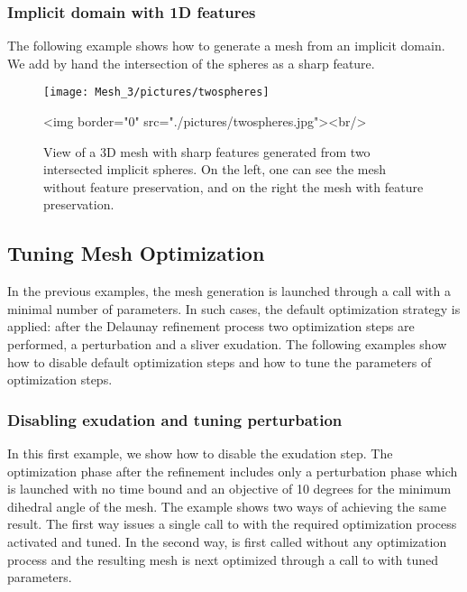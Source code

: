 \subsubsection{Implicit domain with 1D features}
The following example shows how to generate a mesh from an implicit
domain. We add by hand the intersection of the spheres as a sharp feature. 


\begin{figure}[ht]
\begin{center}
 \begin{ccTexOnly}
   \texttt{[image: Mesh\_3/pictures/twospheres]}
 \end{ccTexOnly}
 \begin{ccHtmlOnly}
   <img border="0" src="./pictures/twospheres.jpg"><br/>
 \end{ccHtmlOnly}
 \caption{View of a 3D mesh with sharp features generated from two intersected
 implicit spheres. On the left, one can see the mesh without feature preservation,
 and on the right the mesh with feature preservation.}
  \label{figure:two_spheres_mesh}
\end{center}
\end{figure}


\subsection{Tuning Mesh Optimization}
\label{Mesh_3_subsection_examples_optimization}

In the previous examples, the mesh generation is launched through a  call
 with a minimal number of parameters. In such cases, 
the default optimization strategy is applied: after the Delaunay refinement process
 two optimization steps are performed, a perturbation and  a sliver exudation.
The following examples show how to disable default optimization steps 
and how to tune the parameters of optimization steps.



\subsubsection{Disabling exudation and tuning perturbation}

In this first example, we show how to disable the exudation step.
The optimization phase after the refinement includes only
a perturbation phase which is launched  with no time bound
and an objective of 10 degrees for the minimum dihedral angle
of the mesh.
The example shows two ways of achieving the same result. The first way
issues a single call to  with the required optimization 
process activated and tuned. In the second way,  is first called
without any optimization process and the resulting mesh is next optimized
through a call to  with tuned parameters.

